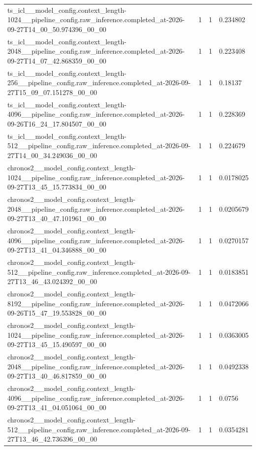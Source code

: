 \begin{tabular}{llll}
ts\_icl\_\_model\_config.context\_length-1024\_\_pipeline\_config.raw\_inference.completed\_at-2026-09-27T14\_00\_50.974396\_00\_00 & 1 & 1 & 0.234802 \\
ts\_icl\_\_model\_config.context\_length-2048\_\_pipeline\_config.raw\_inference.completed\_at-2026-09-27T14\_07\_42.868359\_00\_00 & 1 & 1 & 0.223408 \\
ts\_icl\_\_model\_config.context\_length-256\_\_pipeline\_config.raw\_inference.completed\_at-2026-09-27T15\_09\_07.151278\_00\_00 & 1 & 1 & 0.18137 \\
ts\_icl\_\_model\_config.context\_length-4096\_\_pipeline\_config.raw\_inference.completed\_at-2026-09-26T16\_24\_17.804507\_00\_00 & 1 & 1 & 0.228369 \\
ts\_icl\_\_model\_config.context\_length-512\_\_pipeline\_config.raw\_inference.completed\_at-2026-09-27T14\_00\_34.249036\_00\_00 & 1 & 1 & 0.224679 \\
chronos2\_\_model\_config.context\_length-1024\_\_pipeline\_config.raw\_inference.completed\_at-2026-09-27T13\_45\_15.773834\_00\_00 & 1 & 1 & 0.0178025 \\
chronos2\_\_model\_config.context\_length-2048\_\_pipeline\_config.raw\_inference.completed\_at-2026-09-27T13\_40\_47.101961\_00\_00 & 1 & 1 & 0.0205679 \\
chronos2\_\_model\_config.context\_length-4096\_\_pipeline\_config.raw\_inference.completed\_at-2026-09-27T13\_41\_04.346888\_00\_00 & 1 & 1 & 0.0270157 \\
chronos2\_\_model\_config.context\_length-512\_\_pipeline\_config.raw\_inference.completed\_at-2026-09-27T13\_46\_43.024392\_00\_00 & 1 & 1 & 0.0183851 \\
chronos2\_\_model\_config.context\_length-8192\_\_pipeline\_config.raw\_inference.completed\_at-2026-09-26T15\_47\_19.553828\_00\_00 & 1 & 1 & 0.0472066 \\
chronos2\_\_model\_config.context\_length-1024\_\_pipeline\_config.raw\_inference.completed\_at-2026-09-27T13\_45\_15.490597\_00\_00 & 1 & 1 & 0.0363005 \\
chronos2\_\_model\_config.context\_length-2048\_\_pipeline\_config.raw\_inference.completed\_at-2026-09-27T13\_40\_46.817859\_00\_00 & 1 & 1 & 0.0492338 \\
chronos2\_\_model\_config.context\_length-4096\_\_pipeline\_config.raw\_inference.completed\_at-2026-09-27T13\_41\_04.051064\_00\_00 & 1 & 1 & 0.0756 \\
chronos2\_\_model\_config.context\_length-512\_\_pipeline\_config.raw\_inference.completed\_at-2026-09-27T13\_46\_42.736396\_00\_00 & 1 & 1 & 0.0354281 \\

\end{tabular}
